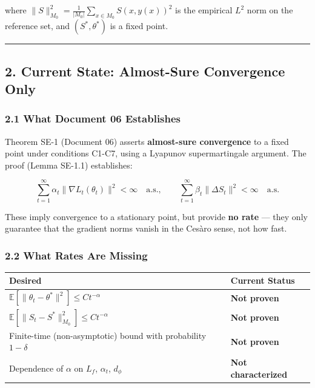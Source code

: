 \documentclass[
  12pt,
]{ctexart}
\begin{document}
where \(\|S\|_{M_0}^2 = \frac{1}{|M_0|}\sum_{x \in M_0} S(x, y(x))^2\)
is the empirical \(L^2\) norm on the reference set, and
\((S^*, \theta^*)\) is a fixed point.

\begin{center}\rule{0.5\linewidth}{0.5pt}\end{center}

\subsection{2. Current State: Almost-Sure Convergence
Only}\label{current-state-almost-sure-convergence-only}

\subsubsection{2.1 What Document 06
Establishes}\label{what-document-06-establishes}

Theorem SE-1 (Document 06) asserts \textbf{almost-sure convergence} to a
fixed point under conditions C1-C7, using a Lyapunov supermartingale
argument. The proof (Lemma SE-1.1) establishes:

\[\sum_{t=1}^\infty \alpha_t \|\nabla L_t(\theta_t)\|^2 < \infty \quad \text{a.s.}, \qquad \sum_{t=1}^\infty \beta_t \|\Delta S_t\|^2 < \infty \quad \text{a.s.}\]

These imply convergence to a stationary point, but provide \textbf{no
rate} --- they only guarantee that the gradient norms vanish in the
Cesàro sense, not how fast.

\subsubsection{2.2 What Rates Are Missing}\label{what-rates-are-missing}

\begin{longtable}[]{@{}
  >{\raggedright\arraybackslash}p{}
  >{\raggedright\arraybackslash}p{}@{}}
\toprule\noalign{}
\begin{minipage}[b]{\linewidth}\raggedright
Desired
\end{minipage} & \begin{minipage}[b]{\linewidth}\raggedright
Current Status
\end{minipage} \\
\midrule\noalign{}
\endhead
\bottomrule\noalign{}
\endlastfoot
\(\mathbb{E}[\|\theta_t - \theta^*\|^2] \leq C t^{-\alpha}\) &
\textbf{Not proven} \\
\(\mathbb{E}[\|S_t - S^*\|_{M_0}^2] \leq C t^{-\alpha}\) & \textbf{Not
proven} \\
Finite-time (non-asymptotic) bound with probability \(1-\delta\) &
\textbf{Not proven} \\
Dependence of \(\alpha\) on \(L_f\), \(\alpha_t\), \(d_\phi\) &
\textbf{Not characterized} \\
\end{longtable}
\end{document}
